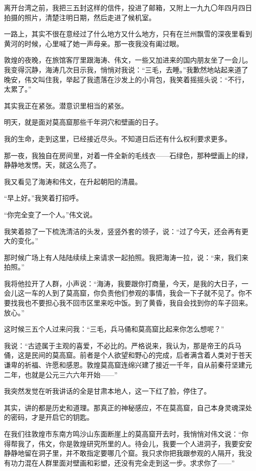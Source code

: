 \par 离开台湾之前，我把三五封这样的信件，投进了邮箱，又附上一九九〇年四月四日拍摄的照片，清楚注明日期，然后走进了候机室。
\par 一路上，其实不很在意经过了什么地方又什么地方，只有在兰州飘雪的深夜里看到黄河的时候，心里喊了她一声母亲。那一夜我没有阖过眼。
\par 敦煌的夜晚，在旅馆客厅里跟海涛、伟文，一些又加进来的国内朋友坐了一会儿。我变得沉静，海涛几次目示我，悄悄对我说：“三毛，去睡。”我歉然地站起来道了晚安，伟文叫住我，举起了我遗落在沙发上的小背包，我笑着摇摇头说：“不行，太累了。”
\par 其实我正在紧张。潜意识里相当的紧张。
\par 明天，就是面对莫高窟那些千年洞穴和壁画的日子。
\par 我的生命，走到这里，已经接近尽头。不知道日后还有什么权利要求更多。
\par 那一夜，我独自在房间里，对着一件全新的毛线衣——石绿色，那种壁画上的绿，静静地发愣。天，就这么亮了。
\par 
\par 我又看见了海涛和伟文，在升起朝阳的清晨。
\par “早上好。”我笑着打招呼。
\par “你完全变了一个人。”伟文说。
\par 我笑着掠了一下梳洗清洁的头发，竖竖外套的领子，说：“过了今天，还会再有更大的变化。”
\par 那时候广场上有人陆陆续续上来请求一起拍照。我把海涛一拉，说：“来，我们来拍照。”
\par 我将他拉开了人群，小声说：“海涛，我要跟你打商量，今天，是我的大日子，一会儿这一车的人到了莫高窟，你负责他们参观的事情，我会一下子就不见了。你不要找我也不要担心我不回市区里来吃中饭。到了黄昏，我自会找到你的车子回来。放心。”
\par 这时候三五个人过来问我：“三毛，兵马俑和莫高窟比起来你怎么想呢？”
\par 我说：“古迹属于主观的喜爱，不必比的。严格说来，我认为，那是帝王的兵马俑，这是民间的莫高窟。前者是个人欲望和野心的完成，后者满含着人类对于苍天谦卑的祈福、许愿和感恩。敦煌莫高窟连绵兴建了接近一千年，自从前秦苻坚建元二年，也就是公元三六六年开始——”
\par 我突然发觉在听我讲话的全是甘肃本地人，这一下红了脸，停住了。
\par 其实，讲的都是历史和道理。那真正的神秘感应，不在莫高窟，自己本身灵魂深处的密码，才是开启它的钥匙。
\par 在我们往敦煌市东南方鸣沙山东面断崖上的莫高窟开去时，我悄悄对伟文说：“你得帮我了，伟文，你是敦煌研究所里的人。待会儿，我要一个人进洞子，我要安安静静地留在洞子里，并不敢指定要哪几个窟。我只求你把我跟参观的人隔开，我没有功力混在人群里面对壁画和彩塑，还没有完全走到这一步。求求你了——”
